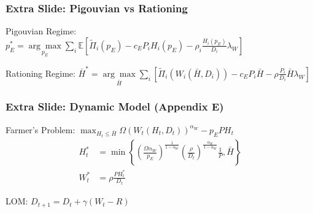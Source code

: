 \documentclass[aspectratio=169]{beamer}
\begin{document}
\begin{frame}
    \frametitle{Extra Slide: Pigouvian vs Rationing}
    \label{pigouvian}
    Pigouvian Regime: $p_{E}^{*}=\underset{p_{E}}{\arg \max } \sum_{i} \mathbb{E}\left[\widetilde{\Pi}_{i}\left(p_{E}\right)-c_{E} P_{i} H_{i}\left(p_{E}\right)-\rho_{i} \frac{H_{i}\left(p_{E}\right)}{D_{i}} \lambda_{W}\right]$

    Rationing Regime: $\bar{H}^* = \underset{\bar{H}}{\arg \max}\sum_{i}\left[\widetilde{\Pi}_{i}\left(W_{i}\left(\bar{H}, D_{i}\right)\right)-c_{E} P_{i} \bar{H}-\rho \frac{P_{i}}{D_{i}} \bar{H} \lambda_{W}\right]$
    \vfill
\end{frame}

\begin{frame}
    \frametitle{Extra Slide: Dynamic Model (Appendix E)}
    \label{pigouvian}
    Farmer's Problem: $\max _{H_{t} \leq \bar{H}} \Omega\left(W_{t}\left(H_{t}, D_{t}\right)\right)^{\alpha_{W}}-p_{E} P H_{t}$
    \begin{align*}
        H_{t}^{*} &=\min \left\{\left(\frac{\Omega \alpha_{W}}{p_{E}}\right)^{\frac{1}{1-\alpha_{W}}}\left(\frac{\rho}{D_{t}}\right)^{\frac{\alpha_{W}}{1-\alpha_{W}}} \frac{1}{P}, \bar{H}\right\} \\
        W_{t}^{*} &=\rho \frac{P H_{t}^{*}}{D_{t}}
    \end{align*}

    LOM: $D_{t+1}=D_{t}+\gamma\left(W_{t}-R\right)$
    
\end{frame}
\end{document}
